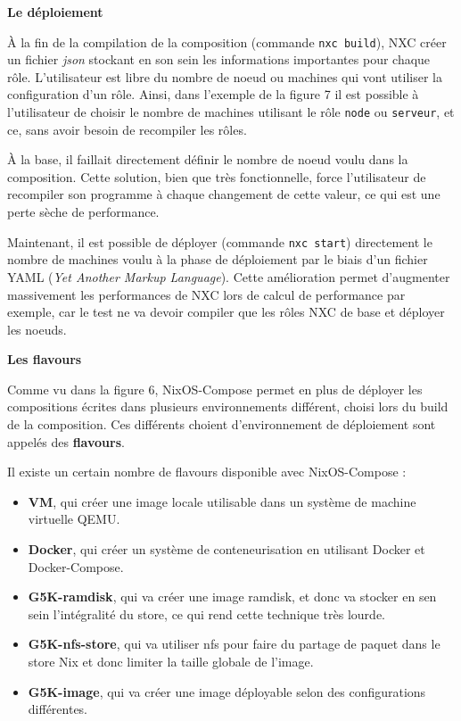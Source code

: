 \documentclass[a4paper,french,12pt, titlepage]{article}
\begin{document}
\textbf{Le déploiement}\newline

À la fin de la compilation de la composition (commande
\texttt{nxc\ build}), NXC créer un fichier \emph{json} stockant en son
sein les informations importantes pour chaque rôle. L'utilisateur est
libre du nombre de noeud ou machines qui vont utiliser la configuration
d'un rôle. Ainsi, dans l'exemple de la figure 7 il est possible à
l'utilisateur de choisir le nombre de machines utilisant le rôle
\texttt{node} ou \texttt{serveur}, et ce, sans avoir besoin de
recompiler les rôles.\newline

À la base, il faillait directement définir le nombre de noeud voulu dans
la composition. Cette solution, bien que très fonctionnelle, force
l'utilisateur de recompiler son programme à chaque changement de cette
valeur, ce qui est une perte sèche de performance.\newline

Maintenant, il est possible de déployer (commande \texttt{nxc\ start})
directement le nombre de machines voulu à la phase de déploiement par le
biais d'un fichier YAML (\emph{Yet Another Markup Language}). Cette
amélioration permet d'augmenter massivement les performances de NXC lors
de calcul de performance par exemple, car le test ne va devoir compiler
que les rôles NXC de base et déployer les noeuds.\newline

\textbf{Les flavours}\newline

Comme vu dans la figure 6, NixOS-Compose permet en plus de déployer les
compositions écrites dans plusieurs environnements différent, choisi
lors du build de la composition. Ces différents choient d'environnement
de déploiement sont appelés des \textbf{flavours}.\newline

Il existe un certain nombre de flavours disponible avec NixOS-Compose
:\newline

\begin{itemize}
\item
  \textbf{VM}, qui créer une image locale utilisable dans un système de
  machine virtuelle QEMU.
\item
  \textbf{Docker}, qui créer un système de conteneurisation en utilisant
  Docker et Docker-Compose.
\item
  \textbf{G5K-ramdisk}, qui va créer une image ramdisk, et donc va
  stocker en sen sein l'intégralité du store, ce qui rend cette
  technique très lourde.
\item
  \textbf{G5K-nfs-store}, qui va utiliser nfs pour faire du partage de
  paquet dans le store Nix et donc limiter la taille globale de l'image.
\item
  \textbf{G5K-image}, qui va créer une image déployable selon des
  configurations différentes.\newline
\end{itemize}
\end{document}
